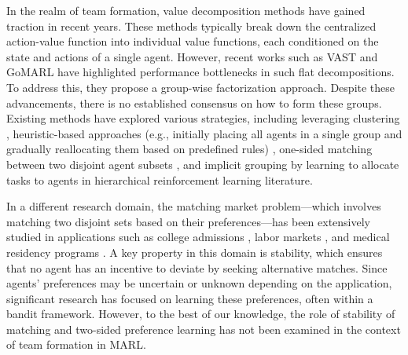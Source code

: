 \documentclass[10pt]{article} %
\begin{document}
In the realm of team formation, value decomposition methods have gained traction in recent years. These methods typically break down the centralized action-value function into individual value functions, each conditioned on the state and actions of a single agent. However, recent works such as VAST \citep{phan2021vast} and GoMARL \citep{zang2024automatic} have highlighted performance bottlenecks in such flat decompositions. To address this, they propose a group-wise factorization approach. Despite these advancements, there is no established consensus on how to form these groups. Existing methods have explored various strategies, including leveraging clustering \citep{phan2021vast}, heuristic-based approaches (e.g., initially placing all agents in a single group and gradually reallocating them based on predefined rules) \citep{zang2024automatic}, one-sided matching between two disjoint agent subsets \citep{shao2022self}, and implicit grouping by learning to allocate tasks to agents \citep{wang2020rode} in hierarchical reinforcement learning literature.

In a different research domain, the matching market problem—which involves matching two disjoint sets based on their preferences—has been extensively studied in applications such as college admissions \citep{gale1962college}, labor markets \citep{roth1999redesign}, and medical residency programs \citep{roth1984evolution}. A key property in this domain is stability, which ensures that no agent has an incentive to deviate by seeking alternative matches. Since agents' preferences may be uncertain or unknown depending on the application, significant research has focused on learning these preferences, often within a bandit framework. However, to the best of our knowledge, the role of stability of matching and two-sided preference learning has not been examined in the context of team formation in MARL. 
\end{document}
